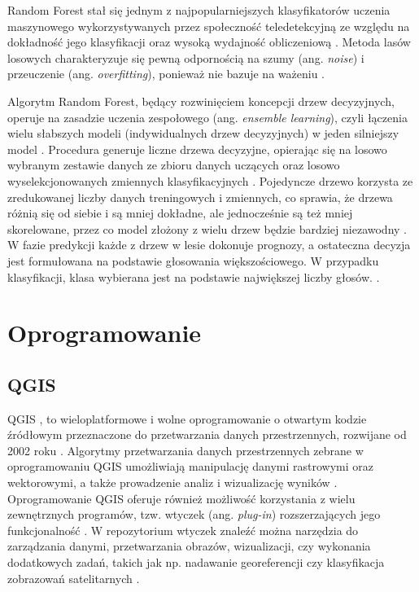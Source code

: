 \documentclass{amuthesis}
\begin{document}
Random Forest stał się jednym z najpopularniejszych klasyfikatorów
uczenia maszynowego wykorzystywanych przez społeczność teledetekcyjną ze
względu na dokładność jego klasyfikacji oraz wysoką wydajność
obliczeniową \autocite{belgiu_2016_rf,sheykhmousa_2020_svm_vs_rf}.
Metoda lasów losowych charakteryzuje się pewną odpornością na szumy
(ang. \emph{noise}) i przeuczenie (ang. \emph{overfitting}), ponieważ
nie bazuje na ważeniu \autocite{gislason_2006_rf}.

Algorytm Random Forest, będący rozwinięciem koncepcji drzew decyzyjnych,
operuje na zasadzie uczenia zespołowego (ang. \emph{ensemble learning}),
czyli łączenia wielu słabszych modeli (indywidualnych drzew decyzyjnych)
w jeden silniejszy model
\autocite{aaron_2018_ml,sekulic_2020_rf_interpolation}. Procedura
generuje liczne drzewa decyzyjne, opierając się na losowo wybranym
zestawie danych ze zbioru danych uczących oraz losowo wyselekcjonowanych
zmiennych klasyfikacyjnych \autocite{breiman_2001_rf}. Pojedyncze drzewo
korzysta ze zredukowanej liczby danych treningowych i zmiennych, co
sprawia, że drzewa różnią się od siebie i są mniej dokładne, ale
jednocześnie są też mniej skorelowane, przez co model złożony z wielu
drzew będzie bardziej niezawodny
\autocite{sekulic_2020_rf_interpolation}. W fazie predykcji każde z
drzew w lesie dokonuje prognozy, a ostateczna decyzja jest formułowana
na podstawie głosowania większościowego. W przypadku klasyfikacji, klasa
wybierana jest na podstawie największej liczby głosów.
\autocite{breiman_2001_rf}.

\hypertarget{oprogramowanie}{%
\section{Oprogramowanie}\label{oprogramowanie}}

\hypertarget{qgis}{%
\subsection{QGIS}\label{qgis}}

QGIS \autocite{qgis}, to wieloplatformowe i wolne oprogramowanie o
otwartym kodzie źródłowym przeznaczone do przetwarzania danych
przestrzennych, rozwijane od 2002 roku
\autocite{hejmanowska_2020_dane,flenniken_2020_qgis}. Algorytmy
przetwarzania danych przestrzennych zebrane w oprogramowaniu QGIS
umożliwiają manipulację danymi rastrowymi oraz wektorowymi, a także
prowadzenie analiz i wizualizację wyników
\autocite{hejmanowska_2020_dane}. Oprogramowanie QGIS oferuje również
możliwość korzystania z wielu zewnętrznych programów, tzw. wtyczek (ang.
\emph{plug-in}) rozszerzających jego funkcjonalność
\autocite{hejmanowska_2020_dane}. W repozytorium wtyczek znaleźć można
narzędzia do zarządzania danymi, przetwarzania obrazów, wizualizacji,
czy wykonania dodatkowych zadań, takich jak np. nadawanie georeferencji
czy klasyfikacja zobrazowań satelitarnych
\autocite{hejmanowska_2020_dane}.
\end{document}

